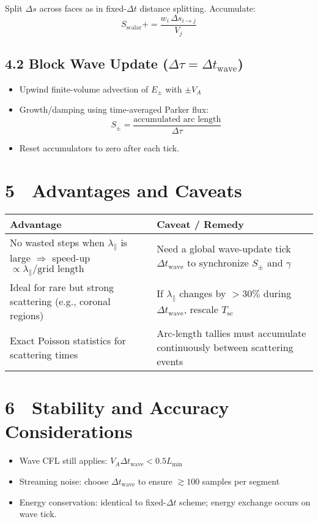 {Split $\Delta s$ across faces as in fixed-$\Delta t$ distance splitting. Accumulate:
\[
S_{\text{scalar}} += \frac{w_i\,\Delta s_{i \rightarrow j}}{V_j}
\]

\subsection*{4.2 Block Wave Update ($\Delta \tau = \Delta t_{\text{wave}}$)}

\begin{itemize}
\item Upwind finite-volume advection of $E_\pm$ with $\pm V_A$
\item Growth/damping using time-averaged Parker flux:
\[
S_\pm = \frac{\text{accumulated arc length}}{\Delta \tau}
\]
\item Reset accumulators to zero after each tick.
\end{itemize}

\section*{5 Advantages and Caveats}

\begin{tabular}{@{}p{} p{}@{}}
\toprule
\textbf{Advantage} & \textbf{Caveat / Remedy} \\
\midrule
No wasted steps when $\lambda_\parallel$ is large $\Rightarrow$ speed-up $\propto \lambda_\parallel/\text{grid length}$ & Need a global wave-update tick $\Delta t_{\text{wave}}$ to synchronize $S_\pm$ and $\gamma$ \\
Ideal for rare but strong scattering (e.g., coronal regions) & If $\lambda_\parallel$ changes by $>30\%$ during $\Delta t_{\text{wave}}$, rescale $T_{\text{sc}}$ \\
Exact Poisson statistics for scattering times & Arc-length tallies must accumulate continuously between scattering events \\
\bottomrule
\end{tabular}

\section*{6 Stability and Accuracy Considerations}

\begin{itemize}
\item Wave CFL still applies: \quad $V_A \Delta t_{\text{wave}} < 0.5 L_{\min}$
\item Streaming noise: choose $\Delta t_{\text{wave}}$ to ensure $\gtrsim 100$ samples per segment
\item Energy conservation: identical to fixed-$\Delta t$ scheme; energy exchange occurs on wave tick.
\end{itemize}

}
